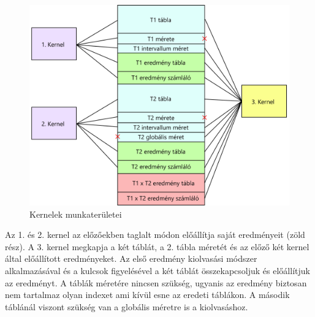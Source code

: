 \begin{figure}[h!]
\centering
\includegraphics[width=12cm]{images/join_kernels.png}
\caption{Kernelek munkaterületei }
\label{fig:opencl}
\end{figure}

Az 1. és 2. kernel az előzőekben taglalt módon előállítja saját eredményeit (zöld rész). 
A 3. kernel megkapja a két táblát, a 2. tábla méretét és az előző két kernel által előállított eredményeket.
Az első eredmény kiolvasási módszer alkalmazásával és a kulcsok figyelésével a két táblát összekapcsoljuk és előállítjuk az eredményt.
A táblák méretére nincsen szükség, ugyanis az eredmény biztosan nem tartalmaz olyan indexet ami kívül esne az eredeti táblákon. A második táblánál viszont szükség van a globális méretre is a kiolvasáshoz.
